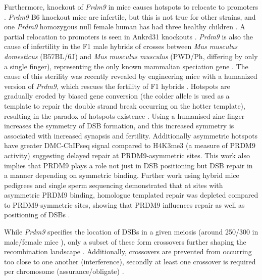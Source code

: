 Furthermore, knockout of \textit{Prdm9} in mice causes hotspots to relocate to promoters \parencite{Brick2012Genetic}. \textit{Prdm9} B6 knockout mice are infertile, but this is not true for other strains, and one \textit{Prdm9} homozygous null female human has had three healthy children \parencite{Hayashi2005histone, Mihola2019Histone, Narasimhan2016Health}. A partial relocation to promoters is seen in Ankrd31 knockouts \parencite{Boekhout2019REC114, Papanikos2018ANKRD31}. \textit{Prdm9} is also the cause of infertility in the F1 male hybrids of crosses between \textit{Mus musculus domesticus} (B57BL/6J) and \textit{Mus musculus musculus} (PWD/Ph, differing by only a single finger), representing the only known mammalian speciation gene \parencite{Forejt1974Genetic, Mihola2009Mouse}. The cause of this sterility was recently revealed by engineering mice with a humanized version of \textit{Prdm9}, which rescues the fertility of F1 hybrids \parencite{Davies2016Reengineering}. Hotspots are gradually eroded by biased gene conversion (the colder allele is used as a template to repair the double strand break occurring on the hotter template), resulting in the paradox of hotspots existence \parencite{Boulton1997hotspot, Coop2007Live, Myers2010Drive, Baker2015PRDM9}. Using a humanised zinc finger increases the symmetry of DSB formation, and this increased symmetry is associated with increased synapsis and fertility. Additionally asymmetric hotspots have greater DMC-ChIPseq signal compared to H4K3me3 (a measure of PRDM9 activity) suggesting delayed repair at PRDM9-asymmetric sites. This work also implies that PRDM9 plays a role not just in DSB positioning but DSB repair in a manner depending on symmetric binding. Further work using hybrid mice pedigrees and single sperm sequencing demonstrated that at sites with asymmetric PRDM9 binding, homologue templated repair was depleted compared to PRDM9-symmetric sites, showing that PRDM9 influences repair as well as positioning of DSBs \parencite{Li2019highresolution, Hinch2019Factors}.

While \textit{Prdm9} specifies the location of DSBs in a given meiosis (around 250/300 in male/female mice \parencite{Baudat2007Regulating}), only a subset of these form crossovers further shaping the recombination landscape \parencite{Youds2011choice}. Additionally, crossovers are prevented from occurring too close to one another (interference), secondly at least one crossover is required per chromosome (assurance/obligate) \parencite{Fledel-Alon2009BroadScale, Hunter2015Meiotic, Otto2019Crossover}.



